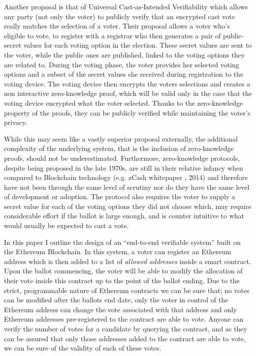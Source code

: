 \documentclass{article}
\begin{document}
Another proposal is that of Universal Cast-as-Intended Verifiability \citep{49_escala_guasch_herranz_morillo_2015} which allows any party (not only the voter) to publicly verify that an encrypted cast vote really matches the selection of a voter. Their proposal allows a voter who's eligible to vote, to register with a registrar who then generates a pair of public-secret values for each voting option in the election. These secret values are sent to the voter, while the public ones are published, linked to the voting options they are related to. During the voting phase, the voter provides her selected voting options and a subset of the secret values she received during registration to the voting device. The voting device then encrypts the voters selections and creates a non interactive zero-knowledge proof, which will be valid only in the case that the voting device encrypted what the voter selected. Thanks to the zero-knowledge property of the proofs, they can be publicly verified while maintaining the voter’s privacy.

While this may seem like a vastly superior proposal externally, the additional complexity of the underlying system, that is the inclusion of zero-knowledge proofs, should not be underestimated. Furthermore, zero-knowledge protocols, despite being proposed in the late 1970s, are still in their relative infancy when compared to Blockchain technology (e.g. zCash whitepaper \citep{50_ben-sasson_chiesa_garman_green_miers_tromer_virza_2014}, 2014) and therefore have not been through the same level of scrutiny nor do they have the same level of development or adoption. The protocol also requires the voter to supply a secret value for each of the voting options they did not choose which, may require considerable effort if the ballot is large enough, and is counter intuitive to what would usually be expected to cast a vote.

In this paper I outline the design of an ``end-to-end verifiable system'' built on the Ethereum Blockchain. In this system, a voter can register an Ethereum address which is then added to a list of \textit{allowed addresses} inside a smart contract. Upon the ballot commencing, the voter will be able to modify the allocation of their vote inside this contract up to the point of the ballot ending. Due to the strict, programmable nature of Ethereum contracts we can be sure that; no votes can be modified after the ballots end date, only the voter in control of the Ethereum address can change the vote associated with that address and only Ethereum addresses pre-registered to the contract are able to vote. Anyone can verify the number of votes for a candidate by querying the contract, and as they can be assured that only those addresses added to the contract are able to vote, we can be sure of the validity of each of these votes. 

\end{document}
